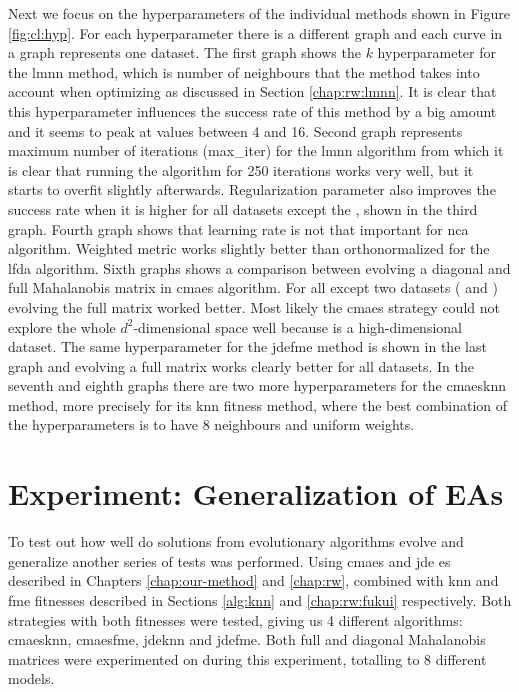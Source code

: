 \documentclass[12pt,a4paper]{report}
\begin{document}
Next we focus on the hyperparameters of the individual methods shown in Figure \ref{fig:cl:hyp}. For each hyperparameter there is a different graph and each curve in a graph represents one dataset. The first graph shows the $k$ hyperparameter for the \ac{lmnn} method, which is number of neighbours that the method takes into account when optimizing as discussed in Section \ref{chap:rw:lmnn}. It is clear that this hyperparameter influences the success rate of this method by a big amount and it seems to peak at values between 4 and 16. Second graph represents maximum number of iterations (max\_iter) for the \ac{lmnn} algorithm from which it is clear that running the algorithm for 250 iterations works very well, but it starts to overfit slightly afterwards. Regularization parameter also improves the success rate when it is higher for all datasets except the , shown in the third graph. Fourth graph shows that learning rate is not that important for \ac{nca} algorithm. Weighted metric works slightly better than orthonormalized for the \ac{lfda} algorithm. Sixth graphs shows a comparison between evolving a diagonal and full Mahalanobis matrix in \ac{cmaes} algorithm. For all except two datasets ( and ) evolving the full matrix worked better. Most likely the \ac{cmaes} strategy could not explore the whole $d^2$-dimensional space well because  is a high-dimensional dataset. The same hyperparameter for the \ac{jdefme} method is shown in the last graph and evolving a full matrix works clearly better for all datasets. In the seventh and eighth graphs there are two more hyperparameters for the \ac{cmaesknn} method, more precisely for its \ac{knn} fitness method, where the best combination of the hyperparameters is to have 8 neighbours and uniform weights.


\section{Experiment: Generalization of EAs} \label{chap:exp:fitness}
To test out how well do solutions from evolutionary algorithms evolve and generalize another series of tests was performed. Using \ac{cmaes} and \ac{jde} \acl{es} described in Chapters \ref{chap:our-method} and \ref{chap:rw}, combined with \ac{knn} and \ac{fme} fitnesses described in Sections \ref{alg:knn} and \ref{chap:rw:fukui} respectively. Both strategies with both fitnesses were tested, giving us 4 different algorithms: \ac{cmaesknn}, \ac{cmaesfme}, \ac{jdeknn} and \ac{jdefme}. Both full and diagonal Mahalanobis matrices were experimented on during this experiment, totalling to 8 different models.
\end{document}
